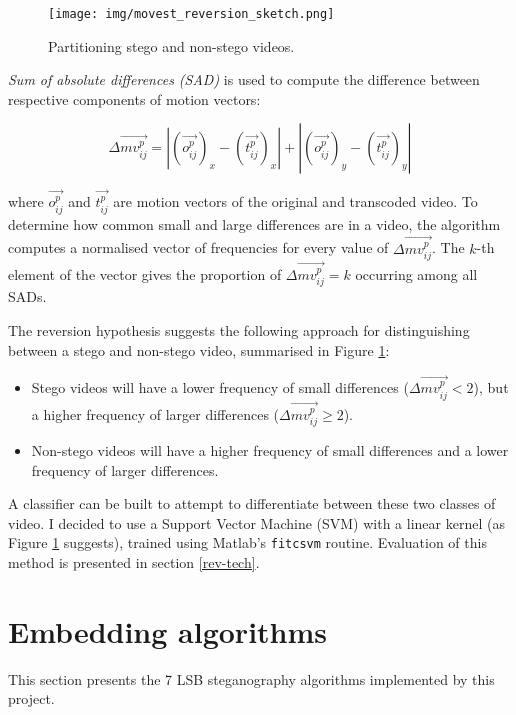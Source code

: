 \documentclass[12pt,british,twoside,notitlepage,usenames,dvipsnames,hypens,final]{report}
\numberwithin{equation}{section}
\numberwithin{figure}{section}
\begin{document}
\begin{figure}
\vspace{-15pt}
\texttt{[image: img/movest\_reversion\_sketch.png]}
\caption{Partitioning stego and non-stego videos.}
\label{fig:movest-reversion-sketch}
\end{figure}

\emph{Sum of absolute differences (SAD)} is used to compute the difference between respective components of motion vectors:

$$ \Delta \overrightarrow{mv^p_{ij}} = |(\overrightarrow{o^p_{ij}})_x - (\overrightarrow{t^p_{ij}})_x| +  |(\overrightarrow{o^p_{ij}})_y - (\overrightarrow{t^p_{ij}})_y|$$

where $\overrightarrow{o^p_{ij}}$ and $\overrightarrow{t^p_{ij}}$ are motion vectors of the original and transcoded video. To determine how common small and large differences are in a video, the algorithm computes a normalised vector of frequencies for every value of $\Delta\overrightarrow{mv^p_{ij}}$. The $k$-th element of the vector gives the proportion of $\Delta\overrightarrow{mv^p_{ij}} = k$ occurring among all SADs.

The reversion hypothesis suggests the following approach for distinguishing between a stego and non-stego video, summarised in Figure \ref{fig:movest-reversion-sketch}:
\begin{itemize}
\item Stego videos will have a lower frequency of small differences ($\Delta\overrightarrow{mv^p_{ij}} < 2$), but a higher frequency of larger differences ($\Delta\overrightarrow{mv^p_{ij}} \geq 2$).
\item Non-stego videos will have a higher frequency of small differences and a lower frequency of larger differences.
\end{itemize}
A classifier can be built to attempt to differentiate between these two classes of video. I decided to use a Support Vector Machine (SVM) with a linear kernel (as Figure \ref{fig:movest-reversion-sketch} suggests), trained using Matlab's \texttt{fitcsvm} routine. Evaluation of this method is presented in section \ref{rev-tech}.

\section{Embedding algorithms}
\label{emb-alg}

This section presents the 7 LSB steganography algorithms implemented by this project.
\end{document}

